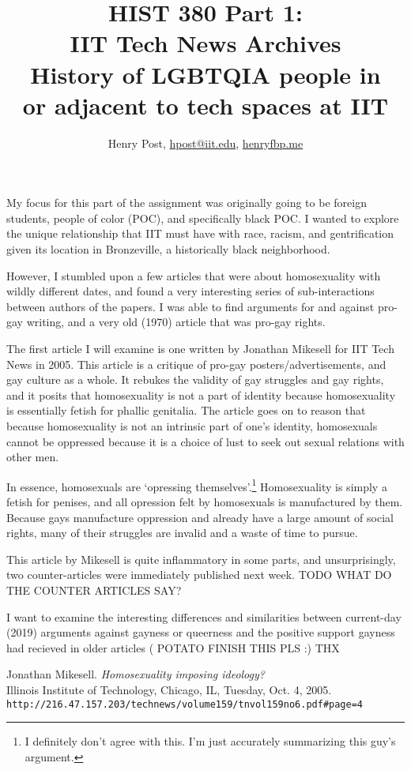 \documentclass[a4paper,12pt]{article}
\title{HIST 380 Part 1: \\ IIT Tech News Archives \\ History of LGBTQIA people in \\ or adjacent to tech spaces at IIT}
\author{Henry Post, \url{hpost@iit.edu}, \url{henryfbp.me}}
\begin{document}
\maketitle

\newpage

	My focus for this part of the assignment was originally going to be foreign students, people of color (POC), and specifically black POC. I wanted to explore the unique relationship that IIT must have with race, racism, and gentrification given its location in Bronzeville, a historically black neighborhood. 

	However, I stumbled upon a few articles that were about homosexuality with wildly different dates, and found a very interesting series of sub-interactions between authors of the papers. I was able to find arguments for and against pro-gay writing, and a very old (1970) article that was pro-gay rights.

	The first article \cite{antigay} I will examine is one written by Jonathan Mikesell for IIT Tech News in 2005. This article is a critique of pro-gay posters/advertisements, and gay culture as a whole. It rebukes the validity of gay struggles and gay rights, and it posits that homosexuality is not a part of identity because homosexuality is essentially fetish for phallic genitalia. The article goes on to reason that because homosexuality is not an intrinsic part of one's identity, homosexuals cannot be oppressed because it is a choice of lust to seek out sexual relations with other men.
	
	In essence, homosexuals are `opressing themselves'.\footnote{I definitely don't agree with this. I'm just accurately summarizing this guy's argument.} Homosexuality is simply a fetish for penises, and all opression felt by homosexuals is manufactured by them. Because gays manufacture oppression and already have a large amount of social rights, many of their struggles are invalid and a waste of time to pursue.
	
	This article by Mikesell is quite inflammatory in some parts, and unsurprisingly, two counter-articles were immediately published next week. TODO WHAT DO THE COUNTER ARTICLES SAY?

	I want to examine the interesting differences and similarities between current-day (2019) arguments against gayness or queerness and the positive support gayness had recieved in older articles ( POTATO FINISH THIS PLS :) THX



\medskip

\begin{thebibliography}{9}

Jonathan Mikesell.
\textit{Homosexuality imposing ideology?} \\
Illinois Institute of Technology, Chicago, IL, Tuesday, Oct. 4, 2005.
\\\texttt{http://216.47.157.203/technews/volume159/tnvol159no6.pdf\#page=4}

\end{thebibliography}


\newpage

\end{document}
